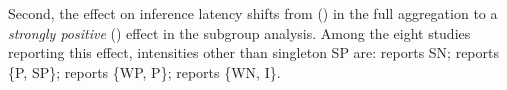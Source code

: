 Second, the effect on inference latency shifts from \emph{\AggInfLatencyProse} (\AggInfLatencyIntensity) in the full aggregation to a \emph{strongly positive} (\SubgroupLatencyIntensity) effect in the subgroup analysis. Among the eight studies reporting this effect, intensities other than singleton SP are: \dubhir reports SN; \xu reports \{P, SP\}; \alshammry reports \{WP, P\}; \peng reports \{WN, I\}.
